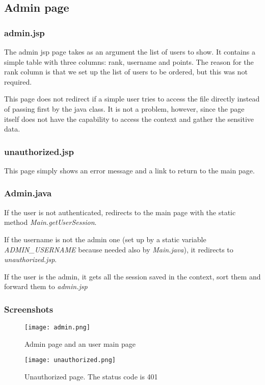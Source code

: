 \subsection{Admin page}
\subsubsection{admin.jsp}
The admin jsp page takes as an argument the list of users to show. It contains a simple table with three columns: rank, username and points. The reason for the rank column is that we set up the list of users to be ordered, but this was not required.

This page does not redirect if a simple user tries to access the file directly instead of passing first by the java class. It is not a problem, however, since the page itself does not have the capability to access the context and gather the sensitive data.
\subsubsection{unauthorized.jsp}
This page simply shows an error message and a link to return to the main page.
\subsubsection{Admin.java}
If the user is not authenticated, redirects to the main page with the static method \textit{Main.getUserSession}. 

If the username is not the admin one (set up by a static variable \textit{ADMIN\_USERNAME} because needed also by \textit{Main.java}), it redirects to \textit{unauthorized.jsp}. 

If the user is the admin, it gets all the session saved in the context, sort them and forward them to \textit{admin.jsp}


\subsubsection{Screenshots}
\begin{figure}[H]
  \centering
  \texttt{[image: admin.png]}
  \caption{Admin page and an user main page}
\end{figure}
\begin{figure}[H]
  \centering
  \texttt{[image: unauthorized.png]}
  \caption{Unauthorized page. The status code is 401}
\end{figure}